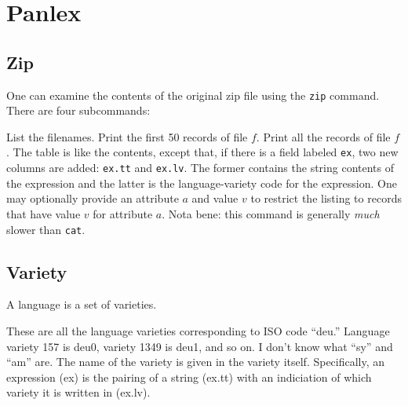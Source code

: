
\section{Panlex}

\subsection{Zip}

One can examine the contents of the original zip file using the
{\tt zip} command.  There are four subcommands:
\begin{mydesc}
 List the filenames.
 Print the first 50 records of file $f$.
 Print all the records of file $f$.
 The table is like the contents, except that, if
there is a field labeled {\tt ex}, two new columns are added: {\tt ex.tt}
and {\tt ex.lv}.  The former contains the string contents of the
expression and the latter is the language-variety code for the
expression.  One may optionally provide an attribute $a$ and value $v$ to
restrict the listing to records that have value $v$ for attribute $a$.
Nota bene: this command is generally {\it much\/} slower than {\tt cat}.
\end{mydesc}

\subsection{Variety}

A language is a set of varieties.
These are all the language varieties corresponding to ISO code
``deu.''  Language variety 157 is deu0, variety 1349 is deu1, and so
on.  I don't know what ``sy'' and ``am'' are.  The name of the variety
is given in the variety itself.  Specifically, an expression (ex) is
the pairing of a string (ex.tt) with an indiciation of which variety it is
written in (ex.lv).

